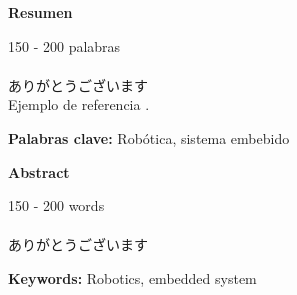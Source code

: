 \label{Resumen}
\begin{center}
	\textbf{{\Large Resumen}}
\end{center}

150 - 200 palabras\\
\lipsum[1-2]\\
ありがとうございます \\ %
Ejemplo de referencia \cite{drenickAdaptiveServomechanisms1957}.


\label{Palabras clave}
\textbf{{\large Palabras clave:}} Robótica, sistema embebido

\vspace{20mm}

\label{Abstract}
\begin{center}
	\textbf{{\Large Abstract}}
\end{center}

150 - 200 words\\
\lipsum[1-2]\\
ありがとうございます %


\label{Keywords}
\textbf{{\large Keywords:}} Robotics, embedded system